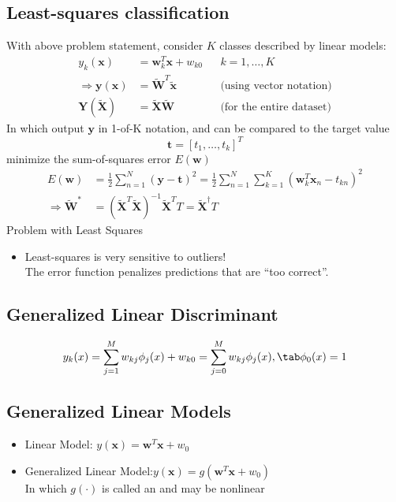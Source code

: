 \subsection{Least-squares classification}
With above problem statement, consider $K$ classes described by linear models:
\begin{align*}
	y_k(\textbf{x}) &= \textbf{w}^T_k\textbf{x} + w_{k0} && k=1, \dots, K \\
	\Rightarrow \textbf{y}(\textbf{x}) &= \widetilde{\textbf{W}}^T\widetilde{\textbf{x}} && \text{(using vector notation)} \\
	\textbf{Y}(\widetilde{\textbf{X}}) &= \widetilde{\textbf{X}}\widetilde{\textbf{W}} && \text{(for the entire dataset)}
\end{align*}
In which output $\textbf{y}$ in 1-of-K notation, and can be compared to the target value
\[\textbf{t}=[t_1, \dots, t_k]^T\]
 minimize the sum-of-squares error $E(\textbf{w})$
\begin{align*}
	E(\textbf{w}) &= \frac{1}{2} \sum_{n=1}^{N} \left(\textbf{y} - \textbf{t}\right)^2 = 
	\frac{1}{2} \sum_{n=1}^{N} \sum_{k=1}^{K} \left(\textbf{w}_k^T\textbf{x}_n-t_{kn}\right)^2 \\
	\Rightarrow \widetilde{\textbf{W}}^* &=  \left( \widetilde{\textbf{X}}^T \widetilde{\textbf{X}} \right)^{-1} \widetilde{\textbf{X}}^T T = \widetilde{\textbf{X}}^\dagger T
\end{align*}
\note Problem with Least Squares
\begin{itemize}
	\item Least-squares is very sensitive to outliers!\\
	The error function penalizes predictions that are “too correct”.
\end{itemize}

\subsection{Generalized Linear Discriminant}
\begin{equation}
y_k(x) = \sum_{j=1}^{M}w_{kj}\phi_j(x) + w_{k0} = \sum_{j=0}^M w_{kj}\phi_j(x), \tab \phi_0(x) = 1
\end{equation}

\subsection{Generalized Linear Models}
\begin{itemize}
	\item Linear Model: \tab\tab\tab $y(\textbf{x}) = \textbf{w}^T\textbf{x} + w_0$
	\item Generalized Linear Model:\tab $y(\textbf{x}) = g(\textbf{w}^T\textbf{x} + w_0)$\\
	In which $g(\cdot)$ is called an  and may be nonlinear
\end{itemize}